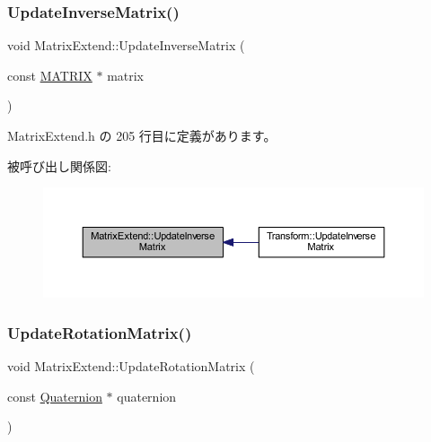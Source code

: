 \subsubsection{\texorpdfstring{Update\+Inverse\+Matrix()}{UpdateInverseMatrix()}}
{\footnotesize\ttfamily void Matrix\+Extend\+::\+Update\+Inverse\+Matrix (\begin{DoxyParamCaption}\item[{const \mbox{\hyperlink{_vector3_d_8h_a032295cd9fb1b711757c90667278e744}{M\+A\+T\+R\+IX}} $\ast$}]{matrix }\end{DoxyParamCaption})\hspace{0.3cm}{\ttfamily [inline]}}



 Matrix\+Extend.\+h の 205 行目に定義があります。

被呼び出し関係図\+:\nopagebreak
\begin{figure}[H]
\begin{center}
\leavevmode
\includegraphics[width=350pt]{class_matrix_extend_a5aa7bce55ed92acb79d21fda51e83146_icgraph}
\end{center}
\end{figure}
\mbox{\label{class_matrix_extend_afa307701c3147fc345ed10dee054affb}} 
\subsubsection{\texorpdfstring{Update\+Rotation\+Matrix()}{UpdateRotationMatrix()}}
{\footnotesize\ttfamily void Matrix\+Extend\+::\+Update\+Rotation\+Matrix (\begin{DoxyParamCaption}\item[{const \mbox{\hyperlink{_vector3_d_8h_a3ee38c9c46d9851e33a9a1113328dafc}{Quaternion}} $\ast$}]{quaternion }\end{DoxyParamCaption})\hspace{0.3cm}{\ttfamily [inline]}}



